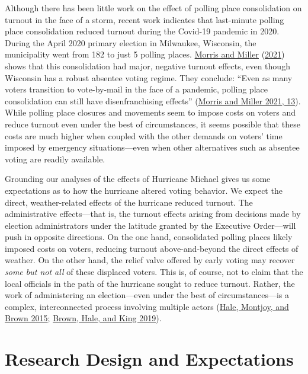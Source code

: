 \documentclass[
  12pt,
]{article}
\begin{document}
Although there has been little work on the effect of polling place consolidation on turnout in the face of a storm, recent work indicates that last-minute polling place consolidation reduced turnout during the Covid-19 pandemic in 2020. During the April 2020 primary election in Milwaukee, Wisconsin, the municipality went from 182 to just 5 polling places. \protect\hyperlink{ref-Morris2021}{Morris and Miller} (\protect\hyperlink{ref-Morris2021}{2021}) shows that this consolidation had major, negative turnout effects, even though Wisconsin has a robust absentee voting regime. They conclude: ``Even as many voters transition to vote-by-mail in the face of a pandemic, polling place consolidation can still have disenfranchising effects'' (\protect\hyperlink{ref-Morris2021}{Morris and Miller 2021, 13}). While polling place closures and movements seem to impose costs on voters and reduce turnout even under the best of circumstances, it seems possible that these costs are much higher when coupled with the other demands on voters' time imposed by emergency situations---even when other alternatives such as absentee voting are readily available.

Grounding our analyses of the effects of Hurricane Michael gives us some expectations as to how the hurricane altered voting behavior. We expect the direct, weather-related effects of the hurricane reduced turnout. The administrative effects---that is, the turnout effects arising from decisions made by election administrators under the latitude granted by the Executive Order---will push in opposite directions. On the one hand, consolidated polling places likely imposed costs on voters, reducing turnout above-and-beyond the direct effects of weather. On the other hand, the relief valve offered by early voting may recover \emph{some but not all} of these displaced voters. This is, of course, not to claim that the local officials in the path of the hurricane sought to reduce turnout. Rather, the work of administering an election---even under the best of circumstances---is a complex, interconnected process involving multiple actors (\protect\hyperlink{ref-Hale2015}{Hale, Montjoy, and Brown 2015}; \protect\hyperlink{ref-Brown2019}{Brown, Hale, and King 2019}).

\hypertarget{research-design-and-expectations}{%
\section*{Research Design and Expectations}\label{research-design-and-expectations}}
\end{document}
